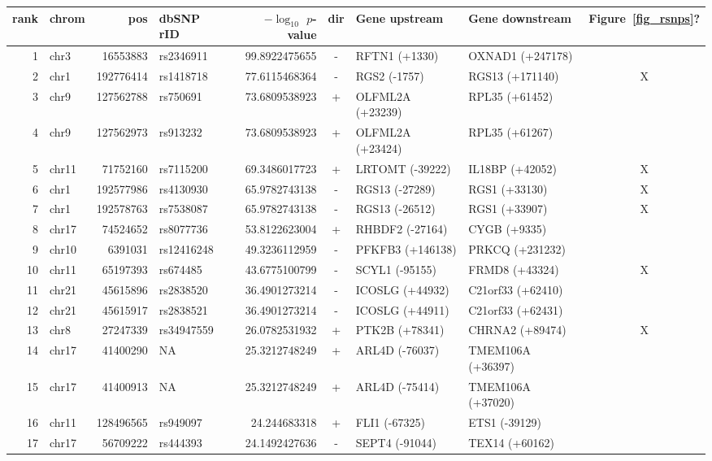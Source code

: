 \begin{table}[h!]
\tiny
\centering
 \begin{tabular}{rlrlrcllc}
 rank & chrom & pos & dbSNP rID & $-\log_{10}$ $p$-value & dir & Gene upstream & Gene downstream & Figure~\ref{fig_rsnps}? \\\hline
1 & chr3 & 16553883 & rs2346911 & 99.8922475655 & - & RFTN1 (+1330) & OXNAD1 (+247178)       & \\
2 & chr1 & 192776414 & rs1418718 & 77.6115468364 & - & RGS2 (-1757) & RGS13 (+171140) & X      \\
3 & chr9 & 127562788 & rs750691 & 73.6809538923 & + & OLFML2A (+23239) & RPL35 (+61452)       & \\
4 & chr9 & 127562973 & rs913232 & 73.6809538923 & + & OLFML2A (+23424) & RPL35 (+61267)       & \\
5 & chr11 & 71752160 & rs7115200 & 69.3486017723 & + & LRTOMT (-39222) & IL18BP (+42052) & X      \\
6 & chr1 & 192577986 & rs4130930 & 65.9782743138 & - & RGS13 (-27289) & RGS1 (+33130) & X      \\
7 & chr1 & 192578763 & rs7538087 & 65.9782743138 & - & RGS13 (-26512) & RGS1 (+33907) & X      \\
8 & chr17 & 74524652 & rs8077736 & 53.8122623004 & + & RHBDF2 (-27164) & CYGB (+9335)       & \\
9 & chr10 & 6391031 & rs12416248 & 49.3236112959 & - & PFKFB3 (+146138) & PRKCQ (+231232)       & \\
10 & chr11 & 65197393 & rs674485 & 43.6775100799 & - & SCYL1 (-95155) & FRMD8 (+43324) & X      \\
11 & chr21 & 45615896 & rs2838520 & 36.4901273214 & - & ICOSLG (+44932) & C21orf33 (+62410)       & \\
12 & chr21 & 45615917 & rs2838521 & 36.4901273214 & - & ICOSLG (+44911) & C21orf33 (+62431)       & \\
13 & chr8 & 27247339 & rs34947559 & 26.0782531932 & + & PTK2B (+78341) & CHRNA2 (+89474) & X      \\
14 & chr17 & 41400290 & NA & 25.3212748249 & + & ARL4D (-76037) & TMEM106A (+36397)       & \\
15 & chr17 & 41400913 & NA & 25.3212748249 & + & ARL4D (-75414) & TMEM106A (+37020)       & \\
16 & chr11 & 128496565 & rs949097 & 24.244683318 & + & FLI1 (-67325) & ETS1 (-39129)       & \\
17 & chr17 & 56709222 & rs444393 & 24.1492427636 & - & SEPT4 (-91044) & TEX14 (+60162)       & \\

\end{tabular}
\end{table}
